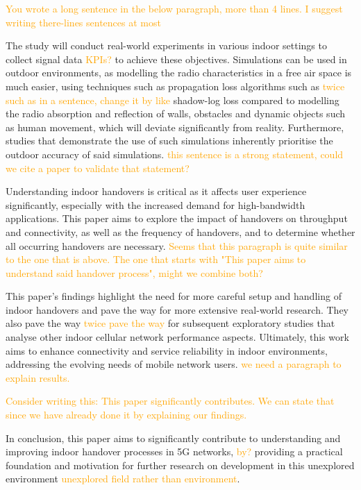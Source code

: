 \textcolor{orange}{You wrote a long sentence in the below paragraph, more than 4 lines. I suggest writing there-lines sentences at most}

The study will conduct real-world experiments in various indoor settings to collect signal data \textcolor{orange}{KPIs?} to achieve these objectives. Simulations can be used in outdoor environments, as modelling the radio characteristics in a free air space is much easier, using techniques such as propagation loss algorithms such as \textcolor{orange}{twice such as in a sentence, change it by like} shadow-log loss \cite{sun_path_2015} compared to modelling the radio absorption and reflection of walls, obstacles and dynamic objects such as human movement, which will deviate significantly from reality. Furthermore, studies that demonstrate the use of such simulations inherently prioritise the outdoor accuracy of said simulations. \textcolor{orange}{this sentence is a strong statement, could we cite a paper to validate that statement?}

Understanding indoor handovers is critical as it affects user experience significantly, especially with the increased demand for high-bandwidth applications. This paper aims to explore the impact of handovers on throughput and connectivity, as well as the frequency of handovers, and to determine whether all occurring handovers are necessary. \textcolor{orange}{Seems that this paragraph is quite similar to the one that is above. The one that starts with "This paper aims to understand said handover process", might we combine both?} 

This paper's findings highlight the need for more careful setup and handling of indoor handovers and pave the way for more extensive real-world research. They also pave the way \textcolor{orange}{twice pave the way} for subsequent exploratory studies that analyse other indoor cellular network performance aspects. Ultimately, this work aims to enhance connectivity and service reliability in indoor environments, addressing the evolving needs of mobile network users.  \textcolor{orange}{we need a paragraph to explain results.}

\textcolor{orange}{Consider writing this: This paper significantly contributes. We can state that since we have already done it by explaining our findings.}

In conclusion, this paper aims to significantly contribute to understanding and improving indoor handover processes in 5G networks, \textcolor{orange}{by?} providing a practical foundation and motivation for further research on development in this unexplored environment \textcolor{orange}{unexplored field rather than environment}. 



